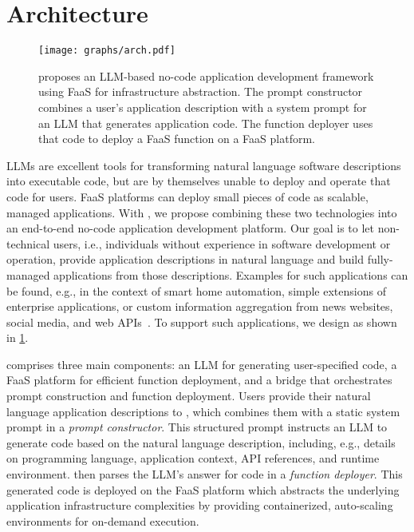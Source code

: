 \section{Architecture}
\label{sec:architecture}

\begin{figure}
    \centering
    \texttt{[image: graphs/arch.pdf]}
    \caption{
        \sysname{} proposes an LLM-based no-code application development framework using FaaS for infrastructure abstraction.
        The prompt constructor combines a user's application description with a system prompt for an LLM that generates application code.
        The function deployer uses that code to deploy a FaaS function on a FaaS platform.
    }
    \label{fig:arch}
\end{figure}

LLMs are excellent tools for transforming natural language software descriptions into executable code, but are by themselves unable to deploy and operate that code for users.
FaaS platforms can deploy small pieces of code as scalable, managed applications.
With \sysname{}, we propose combining these two technologies into an end-to-end no-code application development platform.
Our goal is to let non-technical users, i.e., individuals without experience in software development or operation, provide application descriptions in natural language and build fully-managed applications from those descriptions.
Examples for such applications can be found, e.g., in the context of smart home automation, simple extensions of enterprise applications, or custom information aggregation from news websites, social media, and web APIs~\cite{paper_bermbach2020_webapibenchmarking2}.
To support such applications, we design \sysname{} as shown in \cref{fig:arch}.

\sysname{} comprises three main components: an LLM for generating user-specified code, a FaaS platform for efficient function deployment, and a bridge that orchestrates prompt construction and function deployment.
Users provide their natural language application descriptions to \sysname{}, which combines them with a static system prompt in a \emph{prompt constructor}.
This structured prompt instructs an LLM to generate code based on the natural language description, including, e.g., details on programming language, application context, API references, and runtime environment.
\sysname{} then parses the LLM's answer for code in a \emph{function deployer}.
This generated code is deployed on the FaaS platform which abstracts the underlying application infrastructure complexities by providing containerized, auto-scaling environments for on-demand execution.
